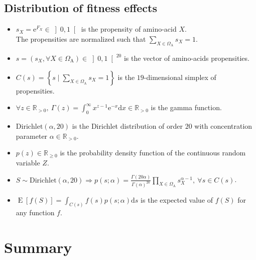 \documentclass{article}
\newcommand{\e}{\mathrm{e}}
\newcommand{\der}{\mathrm{d}}
\newcommand{\SetAa}{\Omega_{\mathrm{A}}}
\begin{document}
    \subsection{Distribution of fitness effects}
    \begin{itemize}
        \item $s_X = \e^{F_X} \in \left]0,1\right[ $ is the propensity of amino-acid $X$.\\
        The propensities are normalized such that $\sum_{X \in \SetAa}s_X = 1 $.
		\item $s = \left( s_X , \forall X \in \SetAa \right) \in \left]0,1\right[^{20} $ is the vector of amino-acids propensities.
		\item $C(s) = \left\{ s \mid \sum_{X \in \SetAa} s_X = 1  \right\} $ is the $19$-dimensional simplex of propensities.
		\item $\forall z \in \mathbb{R}_{>0}, \ \Gamma(z) = \int_{0}^{\infty} x^{z-1} \e^{-x} \der x \in \mathbb{R}_{>0} $ is the gamma function.
		\item $\mathrm{Dirichlet}(\alpha, 20)$ is the Dirichlet distribution of order $20$ with concentration parameter $\alpha \in \mathbb{R}_{>0}$.
		\item $p(z) \in \mathbb{R}_{\geq 0}$ is the probability density function of the continuous random variable $Z$.
		\item $S \sim \mathrm{Dirichlet}(\alpha, 20) \Rightarrow	p(s; \alpha) = {\frac {\Gamma (20 \alpha)}{\Gamma (\alpha )^{20}}} \prod_{X \in \SetAa} s_X^{\alpha-1}, \ \forall s \in C(s)$.
		\item $\operatorname{E}[f(S)] = \int_{C(s)} f(s) p(s; \alpha) \der s$ is the expected value of $f(S)$ for any function $f$.
    \end{itemize}
	
	\section{Summary}
	
\end{document}
